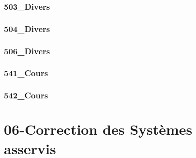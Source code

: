 \subsection{503\_Divers}
\graphicspath{{../05-Modélisation Systèmes Asservis/TD/SLCI/SLCI-07-Ordre12/503_Divers/images/}{../05-Modélisation Systèmes Asservis/TD/SLCI/SLCI-07-Ordre12/503_Divers/}{../Style/png/}}


\subsection{504\_Divers}
\graphicspath{{../05-Modélisation Systèmes Asservis/TD/SLCI/SLCI-07-Ordre12/504_Divers/images/}{../05-Modélisation Systèmes Asservis/TD/SLCI/SLCI-07-Ordre12/504_Divers/}{../Style/png/}}


\subsection{506\_Divers}
\graphicspath{{../05-Modélisation Systèmes Asservis/TD/SLCI/SLCI-07-Ordre12/506_Divers/images/}{../05-Modélisation Systèmes Asservis/TD/SLCI/SLCI-07-Ordre12/506_Divers/}{../Style/png/}}


\subsection{541\_Cours}
\graphicspath{{../05-Modélisation Systèmes Asservis/TD/SLCI/SLCI-07-Ordre12/541_Cours/images/}{../05-Modélisation Systèmes Asservis/TD/SLCI/SLCI-07-Ordre12/541_Cours/}{../Style/png/}}


\subsection{542\_Cours}
\graphicspath{{../05-Modélisation Systèmes Asservis/TD/SLCI/SLCI-07-Ordre12/542_Cours/images/}{../05-Modélisation Systèmes Asservis/TD/SLCI/SLCI-07-Ordre12/542_Cours/}{../Style/png/}}


\clearpage
\chapter{06-Correction des Systèmes asservis}

